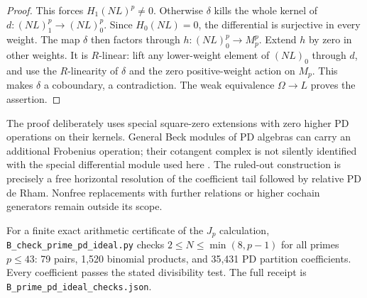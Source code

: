 \begin{proof}
This forces $H_1(NL)^p\ne0$. Otherwise $\delta$
kills the whole kernel of
$d:(NL)_1^p\to(NL)_0^p$. Since $H_0(NL)=0$,
the differential is surjective in every weight.
The map $\delta$ then factors through
$h:(NL)_0^p\to M_p^p$. Extend $h$ by zero in
other weights. It is $R$-linear: lift any
lower-weight element of $(NL)_0$ through $d$,
and use the $R$-linearity of $\delta$ and the
zero positive-weight action on $M_p$.
This makes $\delta$ a coboundary, a contradiction.
The weak equivalence $\Omega\to L$ proves the
assertion.
\end{proof}

The proof deliberately uses special square-zero
extensions with zero higher PD operations on their
kernels. General Beck modules of PD algebras can
carry an additional Frobenius operation; their
cotangent complex is not silently identified with
the special differential module used here
\cite[commutative-operad example]{BDokasFranklandIkonicoff2024}.
The ruled-out construction is precisely a free
horizontal resolution of the coefficient tail
followed by relative PD de Rham. Nonfree
replacements with further relations or higher
cochain generators remain outside its scope.

For a finite exact arithmetic certificate of the
$J_p$ calculation,
\texttt{B\_check\_prime\_pd\_ideal.py} checks
$2\leq N\leq\min(8,p-1)$ for all primes $p\leq43$:
79 pairs, 1,520 binomial products, and 35,431
PD partition coefficients. Every coefficient
passes the stated divisibility test.
The full receipt is
\texttt{B\_prime\_pd\_ideal\_checks.json}.
